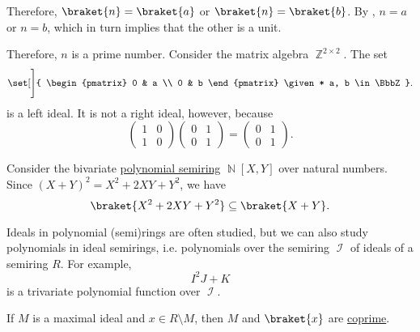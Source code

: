 \begin{example}
\begin{thmenum}
    Therefore, \( \braket{ n } = \braket{ a } \) or \( \braket{ n } = \braket{ b } \). By , \( n = a \) or \( n = b \), which in turn implies that the other is a unit.

    Therefore, \( n \) is a prime number.
     Consider the matrix algebra \( \BbbZ^{2 \times 2} \). The set
    \begin{equation*}
      \set[\Bigg]
      {
        \begin{pmatrix}
          0 & a \\
          0 & b
        \end{pmatrix}
        \given*
        a, b \in \BbbZ
      }.
    \end{equation*}
    is a left ideal. It is not a right ideal, however, because
    \begin{equation*}
      \begin{pmatrix}
        1 & 0 \\
        1 & 0
      \end{pmatrix}
      \begin{pmatrix}
        0 & 1 \\
        0 & 1
      \end{pmatrix}
      =
      \begin{pmatrix}
        0 & 1 \\
        0 & 1
      \end{pmatrix}.
    \end{equation*}

     Consider the bivariate \hyperref[def:polynomial_semiring]{polynomial semiring} \( \BbbN[X, Y] \) over natural numbers. Since \( (X + Y)^2 = X^2 + 2XY + Y^2 \), we have
    \begin{equation*}
      \braket{ X^2 + 2XY + Y^2 } \subseteq \braket{ X + Y }.
    \end{equation*}

     Ideals in polynomial (semi)rings are often studied, but we can also study polynomials in ideal semirings, i.e. polynomials over the semiring \( \mscrI \) of ideals of a semiring \( R \). For example,
    \begin{equation*}
      I^2 J + K
    \end{equation*}
    is a trivariate polynomial function over \( \mscrI \).

     If \( M \) is a maximal ideal and \( x \in R \setminus M \), then \( M \) and \( \braket{ x } \) are \hyperref[def:semiring_ideal/coprime]{coprime}.
  \end{thmenum}
\end{example}

